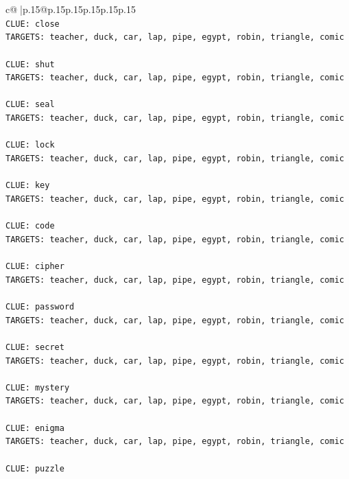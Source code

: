 \documentclass{article}
\begin{document}
{\begin{supertabular}{c@{$\;$}|p{.15\linewidth}@{}p{.15\linewidth}p{.15\linewidth}p{.15\linewidth}p{.15\linewidth}p{.15\linewidth}}
{{{\\ 
\texttt{CLUE: close} \\
\texttt{TARGETS: teacher, duck, car, lap, pipe, egypt, robin, triangle, comic} \\
\\ 
\texttt{CLUE: shut} \\
\texttt{TARGETS: teacher, duck, car, lap, pipe, egypt, robin, triangle, comic} \\
\\ 
\texttt{CLUE: seal} \\
\texttt{TARGETS: teacher, duck, car, lap, pipe, egypt, robin, triangle, comic} \\
\\ 
\texttt{CLUE: lock} \\
\texttt{TARGETS: teacher, duck, car, lap, pipe, egypt, robin, triangle, comic} \\
\\ 
\texttt{CLUE: key} \\
\texttt{TARGETS: teacher, duck, car, lap, pipe, egypt, robin, triangle, comic} \\
\\ 
\texttt{CLUE: code} \\
\texttt{TARGETS: teacher, duck, car, lap, pipe, egypt, robin, triangle, comic} \\
\\ 
\texttt{CLUE: cipher} \\
\texttt{TARGETS: teacher, duck, car, lap, pipe, egypt, robin, triangle, comic} \\
\\ 
\texttt{CLUE: password} \\
\texttt{TARGETS: teacher, duck, car, lap, pipe, egypt, robin, triangle, comic} \\
\\ 
\texttt{CLUE: secret} \\
\texttt{TARGETS: teacher, duck, car, lap, pipe, egypt, robin, triangle, comic} \\
\\ 
\texttt{CLUE: mystery} \\
\texttt{TARGETS: teacher, duck, car, lap, pipe, egypt, robin, triangle, comic} \\
\\ 
\texttt{CLUE: enigma} \\
\texttt{TARGETS: teacher, duck, car, lap, pipe, egypt, robin, triangle, comic} \\
\\ 
\texttt{CLUE: puzzle} \\
}}}
\end{supertabular}}
\end{document}

